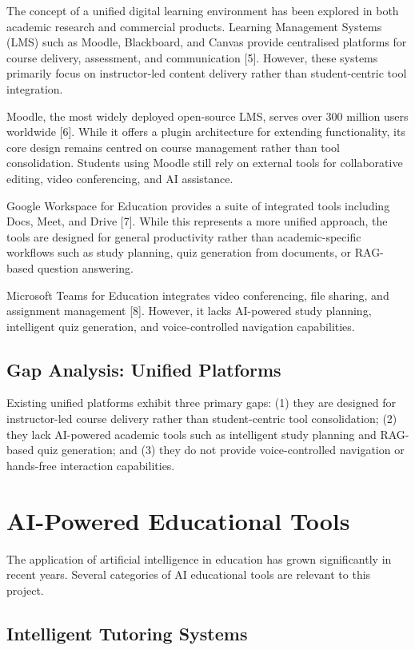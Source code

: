 \documentclass[12pt,a4paper]{report}
\begin{document}
The concept of a unified digital learning environment has been explored in both academic research and commercial products. Learning Management Systems (LMS) such as Moodle, Blackboard, and Canvas provide centralised platforms for course delivery, assessment, and communication [5]. However, these systems primarily focus on instructor-led content delivery rather than student-centric tool integration.

Moodle, the most widely deployed open-source LMS, serves over 300 million users worldwide [6]. While it offers a plugin architecture for extending functionality, its core design remains centred on course management rather than tool consolidation. Students using Moodle still rely on external tools for collaborative editing, video conferencing, and AI assistance.

Google Workspace for Education provides a suite of integrated tools including Docs, Meet, and Drive [7]. While this represents a more unified approach, the tools are designed for general productivity rather than academic-specific workflows such as study planning, quiz generation from documents, or RAG-based question answering.

Microsoft Teams for Education integrates video conferencing, file sharing, and assignment management [8]. However, it lacks AI-powered study planning, intelligent quiz generation, and voice-controlled navigation capabilities.

\subsection{Gap Analysis: Unified Platforms}

Existing unified platforms exhibit three primary gaps: (1) they are designed for instructor-led course delivery rather than student-centric tool consolidation; (2) they lack AI-powered academic tools such as intelligent study planning and RAG-based quiz generation; and (3) they do not provide voice-controlled navigation or hands-free interaction capabilities.

\section{AI-Powered Educational Tools}

The application of artificial intelligence in education has grown significantly in recent years. Several categories of AI educational tools are relevant to this project.

\subsection{Intelligent Tutoring Systems}
\end{document}

